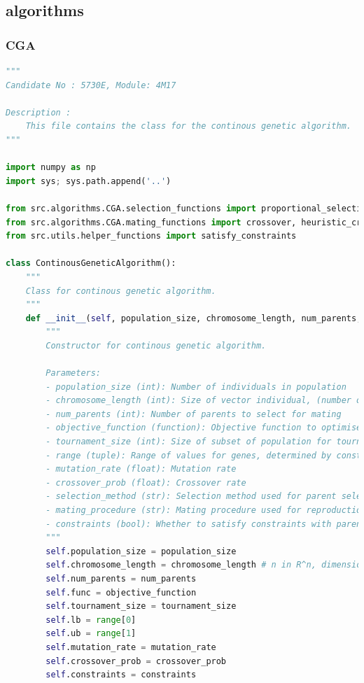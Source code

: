 \documentclass[10pt]{article}
\begin{document}
\subsection{algorithms}
\label{sec:algorithms}
\subsubsection{CGA}
\label{sec:CGA}
\begin{lstlisting}[language=Python, caption=CGA.py, label=CGApy]
"""
Candidate No : 5730E, Module: 4M17 

Description :
    This file contains the class for the continous genetic algorithm.
"""

import numpy as np
import sys; sys.path.append('..')

from src.algorithms.CGA.selection_functions import proportional_selection, tournament_selection, SRS_selection
from src.algorithms.CGA.mating_functions import crossover, heuristic_crossover
from src.utils.helper_functions import satisfy_constraints

class ContinousGeneticAlgorithm():
    """
    Class for continous genetic algorithm.  
    """
    def __init__(self, population_size, chromosome_length, num_parents, objective_function, tournament_size, range=(0,10), mutation_rate=0.1, crossover_prob=0.8, selection_method='Tournament', mating_procedure='Heuristic Crossover', constraints=True):
        """
        Constructor for continous genetic algorithm.

        Parameters:
        - population_size (int): Number of individuals in population    
        - chromosome_length (int): Size of vector individual, (number of genes), i.e. dimension of solution space
        - num_parents (int): Number of parents to select for mating
        - objective_function (function): Objective function to optimise
        - tournament_size (int): Size of subset of population for tournament selection
        - range (tuple): Range of values for genes, determined by constraints of problem
        - mutation_rate (float): Mutation rate
        - crossover_prob (float): Crossover rate
        - selection_method (str): Selection method used for parent selection
        - mating_procedure (str): Mating procedure used for reproduction
        - constraints (bool): Whether to satisfy constraints with parent selection or not
        """
        self.population_size = population_size 
        self.chromosome_length = chromosome_length # n in R^n, dimension of the search space
        self.num_parents = num_parents
        self.func = objective_function
        self.tournament_size = tournament_size
        self.lb = range[0] 
        self.ub = range[1] 
        self.mutation_rate = mutation_rate  
        self.crossover_prob = crossover_prob
        self.constraints = constraints
        

\end{lstlisting}
\end{document}
